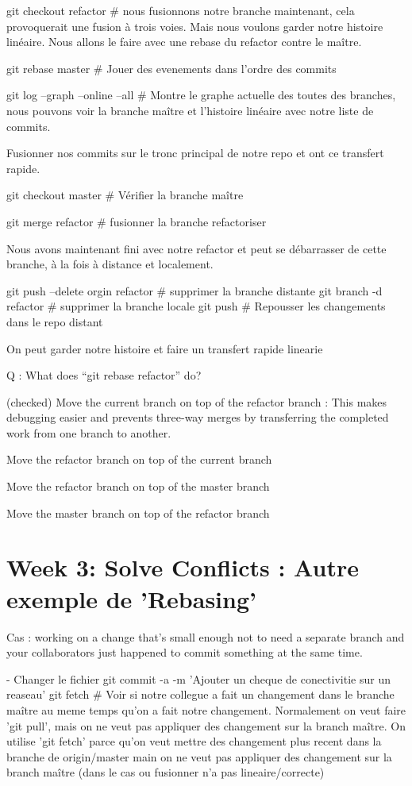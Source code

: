 \documentclass[11pt, onecolumn]{article}
\begin{document}
git checkout refactor   # nous fusionnons notre branche maintenant, cela provoquerait une fusion à trois voies. Mais nous voulons garder notre histoire linéaire. Nous allons le faire avec une rebase du refactor contre le maître. 

git rebase master    # Jouer des evenements dans l'ordre des commits 

git log --graph --online --all     # Montre le graphe actuelle des toutes des branches, nous pouvons voir la branche maître et l'histoire linéaire avec notre liste de commits.

Fusionner nos commits sur le tronc principal de notre repo et ont ce transfert rapide.

git checkout master  #  Vérifier la branche maître

git merge refactor     # fusionner la branche refactoriser

Nous avons maintenant fini avec notre refactor et peut se débarrasser de cette branche, à la fois à distance et localement. 

git push --delete orgin refactor   # supprimer la branche distante
git branch -d refactor     # supprimer la branche locale
git push 		# Repousser les changements dans le repo distant

On peut garder notre histoire et faire un transfert rapide linearie


Q : What does “git rebase refactor” do?

(checked) Move the current branch on top of the refactor branch  : This makes debugging easier and prevents three-way merges by transferring the completed work from one branch to another.

Move the refactor branch on top of the current branch

Move the refactor branch on top of the master branch

Move the master branch on top of the refactor branch


\section{Week 3: Solve Conflicts : Autre exemple de 'Rebasing'}

Cas : working on a change that's small enough not to need a separate branch and your collaborators just happened to commit something at the same time. 

- Changer le fichier
git commit -a -m 'Ajouter un cheque de conectivitie sur un reaseau'
git fetch   # Voir si notre collegue a fait un changement dans le branche maître au meme temps qu'on a fait notre changement. Normalement on veut faire 'git pull', mais on ne veut pas appliquer des changement sur la branch maître.  On utilise 'git fetch' parce qu'on veut mettre des changement plus recent dans la branche de origin/master main on ne veut pas appliquer des changement sur la branch maître (dans le cas ou fusionner n'a pas lineaire/correcte)
\end{document}
